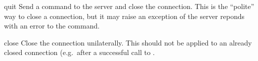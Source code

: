 \begin{funcdesc}{quit}{}
Send a  command to the server and close the connection.
This is the ``polite'' way to close a connection, but it may raise an
exception of the server reponds with an error to the 
command.
\end{funcdesc}

\begin{funcdesc}{close}{}
Close the connection unilaterally.  This should not be applied to an
already closed connection (e.g.\ after a successful call to
.
\end{funcdesc}
